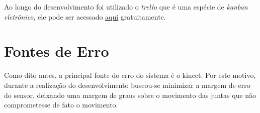   Ao longo do desenvolvimento foi utilizado o \textit{trello}  que é uma espécie de \textit{kanban eletrônico}, ele pode ser acessado \href{https://trello.com/}{aqui} gratuitamente.

\section{Fontes de Erro}\label{sol:fontesErro}
  Como dito antes, a principal fonte do erro do sistema é o kinect. Por este motivo, durante a realização do desenvolvimento buscou-se minimizar a margem de erro
do sensor, deixando uma margem de graus sobre o movimento das juntas que não comprometesse de fato o movimento.

